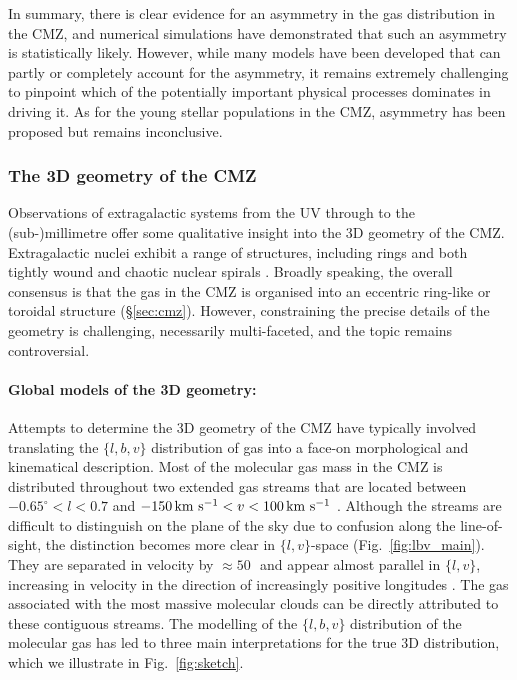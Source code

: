 In summary, there is clear evidence for an asymmetry in the gas distribution in the CMZ, and numerical simulations have demonstrated that such an asymmetry is statistically likely. However, while many models have been developed that can partly or completely account for the asymmetry, it remains extremely challenging to pinpoint which of the potentially important physical processes dominates in driving it. As for the young stellar populations in the CMZ, asymmetry has been proposed but remains inconclusive.

\subsubsection{The 3D geometry of the CMZ} 
\label{sec:3d}

Observations of extragalactic systems from the UV through to the (sub-)millimetre offer some qualitative insight into the 3D geometry of the CMZ. Extragalactic nuclei exhibit a range of structures, including rings and both tightly wound and chaotic nuclear spirals \citep{Peeples2006, Comeron2010, Pan2013, Viti2014, Audibert2019, Callanan2021, Lee2022}.
Broadly speaking, the overall consensus is that the gas in the CMZ is organised into an eccentric ring-like or toroidal structure (\S\ref{sec:cmz}). 
However, constraining the precise details of the geometry is challenging, necessarily multi-faceted, and the topic remains controversial.

\paragraph{Global models of the 3D geometry:}\label{sec:3dmodels} Attempts to determine the 3D geometry of the CMZ have typically involved translating the $\{l,b,v\}$ distribution of gas into a face-on morphological and kinematical description. 
Most of the molecular gas mass in the CMZ \citep[$\sim3\times10^{7}$\,\msun;][]{Sofue1995a} is distributed throughout two extended gas streams that are located between $-0.65^{\circ}<l<0.7$ and $-150\,{\mathrm {\mbox{${\rm km}~{\rm s}^{-1}$}}}<v<100\,{\mathrm {\mbox{${\rm km}~{\rm s}^{-1}$}}}$ \citep{Bally1987, Sofue1995a, Tsuboi1999, Henshaw2016b, Eden2020}.
Although the streams are difficult to distinguish on the plane of the sky due to confusion along the line-of-sight, the distinction becomes more clear in $\{l,v\}$-space (Fig.~\ref{fig:lbv_main}). 
They are separated in velocity by $\approx50$\,\kms \ and appear almost parallel in $\{l,v\}$, increasing in velocity in the direction of increasingly positive longitudes \citep{Henshaw2016b}. 
The gas associated with the most massive molecular clouds can be directly attributed to these contiguous streams. 
The modelling of the $\{l,b,v\}$ distribution of the molecular gas has led to three main interpretations for the true 3D distribution, which we illustrate in Fig.~\ref{fig:sketch}.

